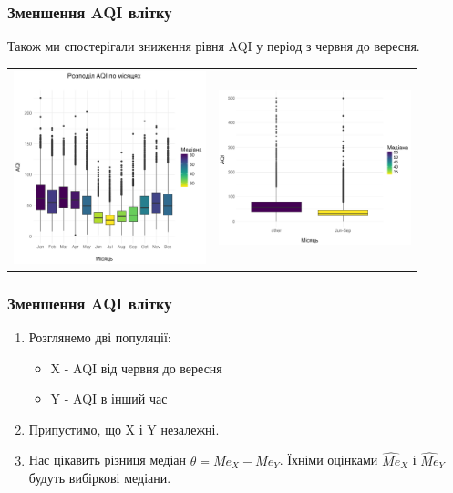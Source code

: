 \documentclass{beamer}
\begin{document}
\begin{frame}
  \frametitle{Зменшення AQI влітку}

  Також ми спостерігали зниження рівня AQI у період з червня до вересня.

  \begin{center}
    \begin{tabular}{cc}
      \includegraphics[width=2.2in]{./plots/question4/seasonal_change.png} &
      \includegraphics[width=2.2in]{./plots/lab2/hypotheses/season_vs_aqi.png}
    \end{tabular}
  \end{center}
\end{frame}

\begin{frame}
  \frametitle{Зменшення AQI влітку}

  \begin{enumerate}
    \item Розглянемо дві популяції:
    \begin{itemize}
      \item X - AQI від червня до вересня
      \item Y - AQI в інший час
    \end{itemize}
    
    \item Припустимо, що X і Y незалежні.  
    
    \item Нас цікавить різниця медіан $\theta = Me_X - Me_Y$.
    Їхніми оцінками $\hat{Me}_X$ і $\hat{Me}_Y$ будуть вибіркові медіани.  
  \end{enumerate}
\end{frame}
\end{document}
